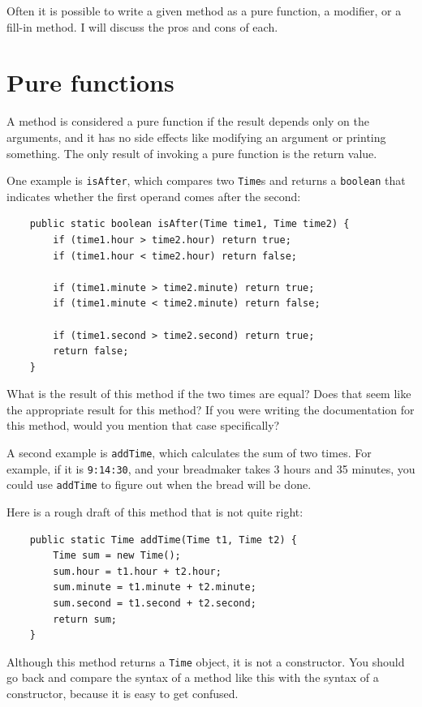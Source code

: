 Often it is possible to write a given method as a pure function, a modifier,
or a fill-in method.  I will discuss the pros and cons of each.


\section{Pure functions}

A method is considered a pure function if the result depends only on
the arguments, and it has no side effects like modifying an argument
or printing something.  The only result of invoking a pure function is
the return value.

One example is {\tt isAfter}, which compares two {\tt Time}s and
returns a {\tt boolean} that indicates whether the first operand
comes after the second:

\begin{lstlisting}
    public static boolean isAfter(Time time1, Time time2) {
        if (time1.hour > time2.hour) return true;
        if (time1.hour < time2.hour) return false;

        if (time1.minute > time2.minute) return true;
        if (time1.minute < time2.minute) return false;

        if (time1.second > time2.second) return true;
        return false;
    }
\end{lstlisting}
%
What is the result of this method if the two times are equal?  Does
that seem like the appropriate result for this method?  If you were
writing the documentation for this method, would you mention that case
specifically?

A second example is {\tt addTime}, which calculates the sum of two
times.  For example, if it is {\tt 9:14:30}, and your breadmaker takes
3 hours and 35 minutes, you could use {\tt addTime} to figure out when
the bread will be done.

Here is a rough draft of this method that is not quite right:

\begin{lstlisting}
    public static Time addTime(Time t1, Time t2) {
        Time sum = new Time();
        sum.hour = t1.hour + t2.hour;
        sum.minute = t1.minute + t2.minute;
        sum.second = t1.second + t2.second;
        return sum;
    }
\end{lstlisting}
%
Although this method returns a {\tt Time} object, it is not
a constructor.  You should go back and compare the syntax of
a method like this with the syntax of a constructor, because
it is easy to get confused.

